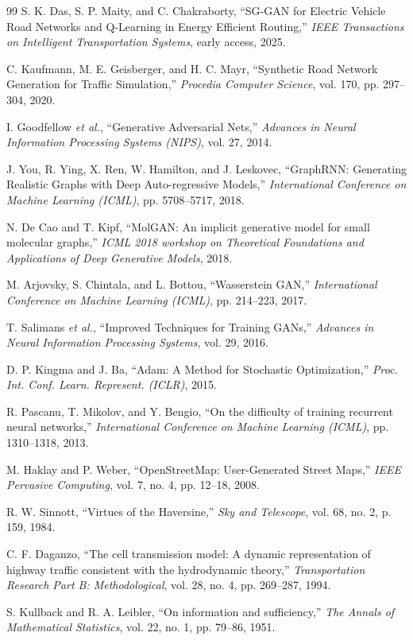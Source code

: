 \documentclass{article}
\begin{document}
\begin{thebibliography}{99}
S. K. Das, S. P. Maity, and C. Chakraborty, ``SG-GAN for Electric Vehicle Road Networks and Q-Learning in Energy Efficient Routing,'' \textit{IEEE Transactions on Intelligent Transportation Systems}, early access, 2025.

C. Kaufmann, M. E. Geisberger, and H. C. Mayr, ``Synthetic Road Network Generation for Traffic Simulation,'' \textit{Procedia Computer Science}, vol. 170, pp. 297--304, 2020.

I. Goodfellow \textit{et al.}, ``Generative Adversarial Nets,'' \textit{Advances in Neural Information Processing Systems (NIPS)}, vol. 27, 2014.

J. You, R. Ying, X. Ren, W. Hamilton, and J. Leskovec, ``GraphRNN: Generating Realistic Graphs with Deep Auto-regressive Models,'' \textit{International Conference on Machine Learning (ICML)}, pp. 5708--5717, 2018.

N. De Cao and T. Kipf, ``MolGAN: An implicit generative model for small molecular graphs,'' \textit{ICML 2018 workshop on Theoretical Foundations and Applications of Deep Generative Models}, 2018.

M. Arjovsky, S. Chintala, and L. Bottou, ``Wasserstein GAN,'' \textit{International Conference on Machine Learning (ICML)}, pp. 214--223, 2017.

T. Salimans \textit{et al.}, ``Improved Techniques for Training GANs,'' \textit{Advances in Neural Information Processing Systems}, vol. 29, 2016.

D. P. Kingma and J. Ba, ``Adam: A Method for Stochastic Optimization,'' \textit{Proc. Int. Conf. Learn. Represent. (ICLR)}, 2015.

R. Pascanu, T. Mikolov, and Y. Bengio, ``On the difficulty of training recurrent neural networks,'' \textit{International Conference on Machine Learning (ICML)}, pp. 1310--1318, 2013.

M. Haklay and P. Weber, ``OpenStreetMap: User-Generated Street Maps,'' \textit{IEEE Pervasive Computing}, vol. 7, no. 4, pp. 12--18, 2008.

R. W. Sinnott, ``Virtues of the Haversine,'' \textit{Sky and Telescope}, vol. 68, no. 2, p. 159, 1984.

C. F. Daganzo, ``The cell transmission model: A dynamic representation of highway traffic consistent with the hydrodynamic theory,'' \textit{Transportation Research Part B: Methodological}, vol. 28, no. 4, pp. 269--287, 1994.

S. Kullback and R. A. Leibler, ``On information and sufficiency,'' \textit{The Annals of Mathematical Statistics}, vol. 22, no. 1, pp. 79--86, 1951.
\end{thebibliography}
\end{document}

